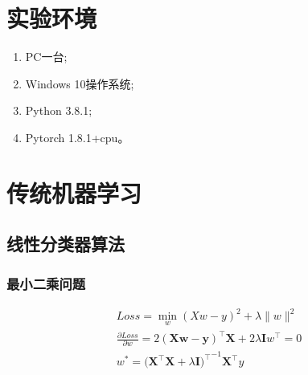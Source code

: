 \documentclass{ctexart}
\begin{document}
\section{\hei 实验环境}
\begin{enumerate}
    \item PC一台;
    \item Windows 10操作系统;
    \item Python 3.8.1;
    \item Pytorch 1.8.1+cpu。
\end{enumerate}

\section{\hei 传统机器学习}
\subsection{\hei 线性分类器算法}
\subsubsection{\hei 最小二乘问题}
\begin{equation}\begin{aligned}
        Loss=\min _{w}(X w-y)^{2}+\lambda\|w\|^{2}                                                                            \\
        \frac{\partial Loss}{\partial w}=2(\mathbf{X} \mathbf{w}-\mathbf{y})^{\top} \mathbf{X}+2\lambda \mathbf{I} w^{\top}=0 \\
        w^{*}= ({\mathbf{X}^{\top}\mathbf{X}+\lambda\mathbf{I})^{\top}}^{-1}\mathbf{X}^{\top}y
    \end{aligned}
\end{equation}
\end{document}
